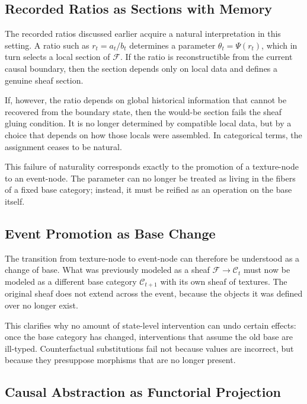 \documentclass[11pt]{article}
\begin{document}
\subsection{Recorded Ratios as Sections with Memory}

The recorded ratios discussed earlier acquire a natural interpretation in this
setting. A ratio such as $r_t = a_t / b_t$ determines a parameter
$\theta_t = \Psi(r_t)$, which in turn selects a local section of $\mathcal{F}$.
If the ratio is reconstructible from the current causal boundary, then the
section depends only on local data and defines a genuine sheaf section.

If, however, the ratio depends on global historical information that cannot be
recovered from the boundary state, then the would-be section fails the sheaf
gluing condition. It is no longer determined by compatible local data, but by a
choice that depends on how those locals were assembled. In categorical terms,
the assignment ceases to be natural.

This failure of naturality corresponds exactly to the promotion of a
texture-node to an event-node. The parameter can no longer be treated as living
in the fibers of a fixed base category; instead, it must be reified as an
operation on the base itself.

\subsection{Event Promotion as Base Change}

The transition from texture-node to event-node can therefore be understood as a
change of base. What was previously modeled as a sheaf
$\mathcal{F} \to \mathcal{C}_t$ must now be modeled as a different base category
$\mathcal{C}_{t+1}$ with its own sheaf of textures. The original sheaf does not
extend across the event, because the objects it was defined over no longer
exist.

This clarifies why no amount of state-level intervention can undo certain
effects: once the base category has changed, interventions that assume the old
base are ill-typed. Counterfactual substitutions fail not because values are
incorrect, but because they presuppose morphisms that are no longer present.

\subsection{Causal Abstraction as Functorial Projection}
\end{document}
